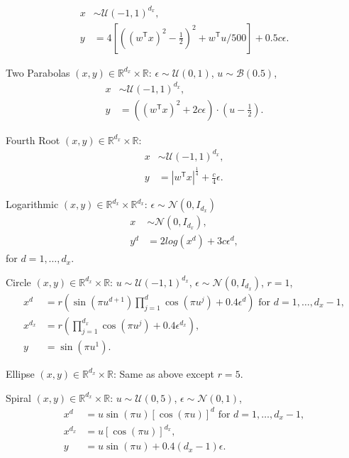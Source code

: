 \documentclass[11pt]{article}
\providecommand{\mc}[1]{\mathcal{#1}}
\newcommand{\Real}{\mathbb{R}}
\newcommand{\T}{^{\ensuremath{\mathsf{T}}}}           %
\begin{document}
\begin{compactenum}
\begin{align*}
x &\sim \mc{U}(-1,1)^{d_{x}},\\
y&=4\left[ \left( (w\T x)^2 - \tfrac{1}{2} \right)^2 + w\T u/500 \right]+0.5c\epsilon.
\end{align*}
\item Two Parabolas $(x,y) \in \Real^{d_{x}} \times \Real$: $\epsilon \sim \mc{U}(0,1)$, $u \sim \mc{B}(0.5)$,
\begin{align*}
x &\sim \mc{U}(-1,1)^{d_{x}},\\
y&=\left( (w\T x)^2  + 2c\epsilon\right) \cdot (u-\tfrac{1}{2}).
\end{align*}
\item Fourth Root $(x,y) \in \Real^{d_{x}} \times \Real$: 
\begin{align*}
x &\sim \mc{U}(-1,1)^{d_{x}},\\
y&=|w\T x|^\frac{1}{4}+\frac{c}{4}\epsilon.
\end{align*}
\item Logarithmic $(x,y) \in \Real^{d_{x}} \times \Real^{d_{x}}$: $\epsilon \sim \mc{N}(0, I_{d_{x}})$
\begin{align*}
x &\sim \mc{N}(0, I_{d_{x}}),\\
y^{d}&=2log(x^{d})+3c\epsilon^{d},
\end{align*}
for $d=1,\ldots,d_{x}$.
\item Circle $(x,y) \in \Real^{d_{x}} \times \Real$: $u \sim \mc{U}(-1,1)^{d_{x}}$, $\epsilon \sim \mc{N}(0, I_{d_{x}})$, $r=1$,
\begin{align*}
x^{d}&=r \left(\sin(\pi u^{d+1})  \prod_{j=1}^{d} \cos(\pi u^{j})+0.4 \epsilon^{d}\right) \mbox{ for $d=1,\ldots,d_{x}-1$},\\
x^{d_{x}}&=r \left(\prod_{j=1}^{d_{x}} \cos(\pi u^{j})+0.4 \epsilon^{d_{x}}\right),\\
y&= \sin(\pi u^{1}).
\end{align*}
\item Ellipse $(x,y) \in \Real^{d_{x}} \times \Real$: Same as above except $r=5$.

\item Spiral $(x,y) \in \Real^{d_{x}} \times \Real$: $u \sim \mc{U}(0,5)$, $\epsilon \sim \mc{N}(0, 1)$, 
\begin{align*}
x^{d}&=u \sin(\pi u)  [\cos(\pi u)]^{d} \mbox{ for $d=1,\ldots,d_{x}-1$},\\
x^{d_{x}}&=u [\cos(\pi u)]^{d_{x}},\\
y&= u \sin(\pi u) +0.4 (d_{x}-1)\epsilon.
\end{align*}


\end{compactenum}
\end{document}
